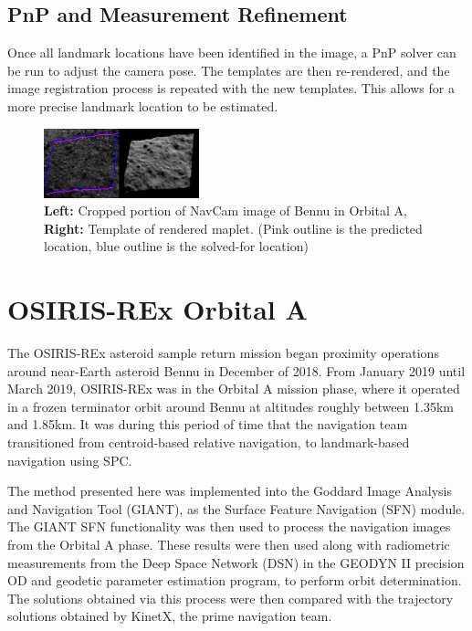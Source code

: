 \documentclass{RPI-SIW}
\begin{document}
\subsection*{PnP and Measurement Refinement}
Once all landmark locations have been identified in the image, a PnP solver can be run to adjust the camera pose.  The templates are then re-rendered, and the image registration process is repeated with the new templates.  This allows for a more precise landmark location to be estimated.

\begin{figure}[h]
	\centering
	\includegraphics[width=0.4\textwidth]{figs/sfn_sample.png}
	\caption{\textbf{Left:} Cropped portion of NavCam image of Bennu in Orbital A, \textbf{Right:} Template of rendered maplet.  (Pink outline is the predicted location, blue outline is the solved-for location)}
	\label{figs::samplefit}
\end{figure}


\section*{OSIRIS-REx Orbital A}
The OSIRIS-REx asteroid sample return mission began proximity operations around near-Earth asteroid Bennu in December of 2018.  From January 2019 until March 2019, OSIRIS-REx was in the Orbital A mission phase, where it operated in a frozen terminator orbit around Bennu at altitudes roughly between 1.35km and 1.85km.  It was during this period of time that the navigation team transitioned from centroid-based relative navigation, to landmark-based navigation using SPC.

The method presented here was implemented into the Goddard Image Analysis and Navigation Tool (GIANT)\cite{andrew}, as the Surface Feature Navigation (SFN) module.  The GIANT SFN functionality was then used to process the navigation images from the Orbital A phase.  These results were then used along with radiometric measurements from the Deep Space Network (DSN) in the GEODYN II precision OD and geodetic parameter estimation program, to perform orbit determination.  The solutions obtained via this process were then compared with the trajectory solutions obtained by KinetX, the prime navigation team. 
\end{document}
